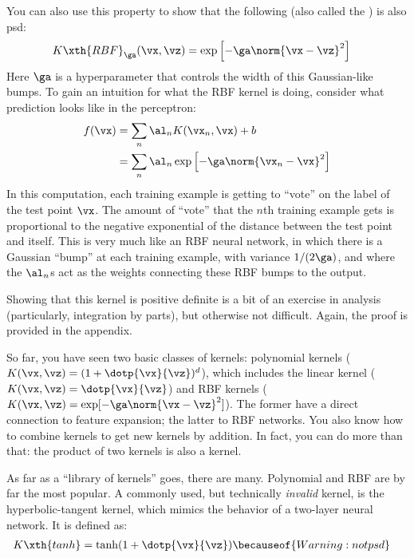 You can also use this property to show that the following
 (also called the ) is
also psd:
%
\begin{align}
K\xth{RBF}_\ga(\vx,\vz) &= \exp\left[ - \ga \norm{\vx-\vz}^2 \right]
\end{align}
%
Here $\ga$ is a hyperparameter that controls the width of this
Gaussian-like bumps.  To gain an intuition for what the RBF kernel is
doing, consider what prediction looks like in the perceptron:
%
\begin{align}
f(\vx) &= \sum_n \al_n K(\vx_n, \vx) + b \\
&= \sum_n \al_n \exp\left[ - \ga \norm{\vx_n-\vx}^2 \right]
\end{align}
%
In this computation, each training example is getting to ``vote'' on
the label of the test point $\vx$.  The amount of ``vote'' that the
$n$th training example gets is proportional to the negative
exponential of the distance between the test point and itself.  This
is very much like an RBF neural network, in which there is a Gaussian
``bump'' at each training example, with variance $1/(2\ga)$, and where
the $\al_n$s act as the weights connecting these RBF bumps to the
output.

Showing that this kernel is positive definite is a bit of an exercise
in analysis (particularly, integration by parts), but otherwise not
difficult.  Again, the proof is provided in the appendix.

So far, you have seen two basic classes of kernels: polynomial kernels
($K(\vx,\vz) = (1 + \dotp{\vx}{\vz})^d$), which includes the linear
kernel ($K(\vx,\vz) = \dotp{\vx}{\vz}$) and RBF kernels ($K(\vx,\vz) =
\exp[-\ga \norm{\vx-\vz}^2]$).  The former have a direct connection to
feature expansion; the latter to RBF networks.  You also know how to
combine kernels to get new kernels by addition.  In fact, you can do
more than that: the product of two kernels is also a kernel.

As far as a ``library of kernels'' goes, there are many.  Polynomial
and RBF are by far the most popular.  A commonly used, but technically
\emph{invalid} kernel, is the hyperbolic-tangent kernel, which mimics
the behavior of a two-layer neural network.  It is defined as:
%
\begin{align}
K\xth{tanh} &= \tanh(1 + \dotp{\vx}{\vz})
\becauseof{Warning: not psd}
\end{align}

